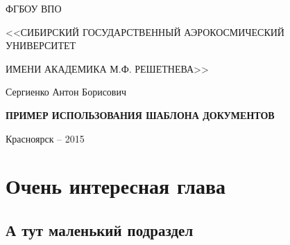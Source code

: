 \documentclass[a4paper,12pt]{report}
\begin{document}

\thispagestyle{empty}

\begin{center}
\MakeUppercase{ФГБОУ ВПО} \par
\MakeUppercase{<<Сибирский государственный аэрокосмический университет} \par \MakeUppercase{имени академика М.Ф. Решетнева>>}\par 
\par
\end{center}

\vspace{50mm}

\begin{center}
{\large Сергиенко Антон Борисович}
\end{center}

\vspace{5mm}
\begin{center}
{\bf \large \MakeUppercase{Пример использования шаблона документов}
\par}

\vspace{20mm}

\end{center}

\vspace{100mm}


\begin{center}
{Красноярск -- 2015}
\end{center}

\tableofcontents
\clearpage


\chapter{Очень интересная глава}

\section {А тут маленький подраздел}
\end{document}
